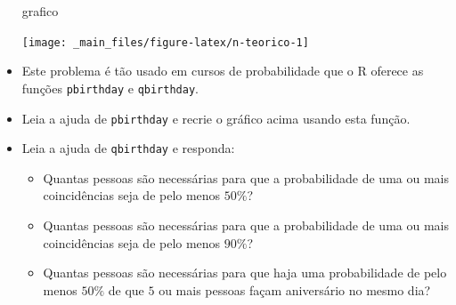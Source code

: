 \documentclass[
  11pt]{report}
\newenvironment{Shaded}{\begin{snugshade}}{\end{snugshade}}
\newcommand{\NormalTok}[1]{#1}
\renewenvironment{Shaded}{
    \begin{mdframed}[%
      roundcorner=2pt,%
      innerleftmargin=5pt,%
      innerrightmargin=5pt,%
      topline=true,%
      leftline=true,%
      rightline=true,%
      bottomline=true,%
      linewidth=0.5pt,%
      linecolor=black!20,%
      backgroundcolor=black!2,%
      skipabove=2ex,%
      skipbelow=2.5ex%
    ]%
  }
  {
    \end{mdframed}
  }
\begin{document}
\begin{itemize}
\begin{Shaded}
\begin{Highlighting}[]
\NormalTok{grafico}
\end{Highlighting}
\end{Shaded}

  \begin{center}\texttt{[image: \_main\_files/figure-latex/n-teorico-1]} \end{center}
\item
  Este problema é tão usado em cursos de probabilidade que o R oferece as funções \texttt{pbirthday} e \texttt{qbirthday}.
\item
  Leia a ajuda de \texttt{pbirthday} e recrie o gráfico acima usando esta função.
\item
  Leia a ajuda de \texttt{qbirthday} e responda:

  \begin{itemize}
  \item
    Quantas pessoas são necessárias para que a probabilidade de uma ou mais coincidências seja de pelo menos $50\%$?

  \item
    Quantas pessoas são necessárias para que a probabilidade de uma ou mais coincidências seja de pelo menos $90\%$?

  \item
    Quantas pessoas são necessárias para que haja uma probabilidade de pelo menos $50\%$ de que $5$ ou mais pessoas façam aniversário no mesmo dia?

  \end{itemize}
\end{itemize}
\end{document}
